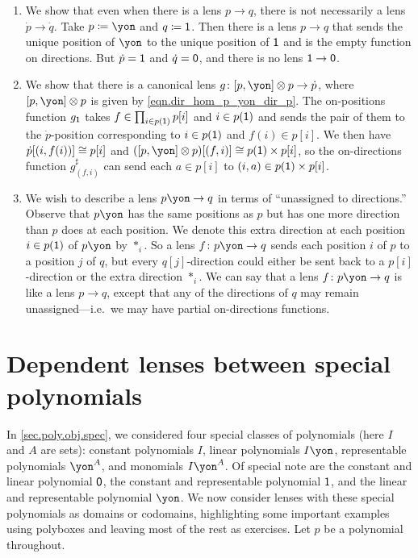 \documentclass[Book-Poly]{subfiles}
\begin{document}
\begin{exercise}
\begin{solution}
\begin{enumerate}
	\item We show that even when there is a lens $p \to q$, there is not necessarily a lens $\dot{p}\to\dot{q}$.
	Take $p \coloneqq \yon$ and $q \coloneqq \textsf{1}$.
	Then there is a lens $p \to q$ that sends the unique position of $\yon$ to the unique position of $\textsf{1}$ and is the empty function on directions.
	But $\dot{p} = \textsf{1}$ and $\dot{q} = \textsf{0}$, and there is no lens $\textsf{1} \to \textsf{0}$.

	\item We show that there is a canonical lens $g \colon \ihom{p,\yon} \otimes p \to \dot{p}$, where $\ihom{p,\yon} \otimes p$ is given by \eqref{eqn.dir_hom_p_yon_dir_p}.
	The on-positions function $g_{\textsf{1}}$ takes $f \in \prod_{i \in p(\textsf{1})} p[i]$ and $i \in p(\textsf{1})$ and sends the pair of them to the $\dot{p}$-position corresponding to $i \in p(\textsf{1})$ and $f(i) \in p[i]$.
	We then have $\dot{p}[(i, f(i))] \cong p[i]$ and $(\ihom{p,\yon} \otimes p)[(f, i)] \iso p(\1) \times p[i]$, so the on-directions function $g^\sharp_{(f,i)}$ can send each $a \in p[i]$ to $(i, a) \in p(\textsf{1}) \times p[i]$.

	\item We wish to describe a lens $p\yon \to q$ in terms of ``unassigned to directions.''
	Observe that $p\yon$ has the same positions as $p$ but has one more direction than $p$ does at each position.
	We denote this extra direction at each position $i \in p(\textsf{1})$ of $p\yon$ by $\ast_i$.
	So a lens $f \colon p\yon\to q$ sends each position $i$ of $p$ to a position $j$ of $q$, but every $q[j]$-direction could either be sent back to a $p[i]$-direction or the extra direction $\ast_i$.
	We can say that a lens $f \colon p\yon \to q$ is like a lens $p \to q$, except that any of the directions of $q$ may remain unassigned---i.e.\ we may have partial on-directions functions.
\end{enumerate}
\end{solution}
\end{exercise}

\section{Dependent lenses between special polynomials}

In \cref{sec.poly.obj.spec}, we considered four special classes of polynomials (here $I$ and $A$ are sets): constant polynomials $I$, linear polynomials $I\yon$, representable polynomials $\yon^A$, and monomials $I\yon^A$.
Of special note are the constant and linear polynomial $\textsf{0}$, the constant and representable polynomial $\textsf{1}$, and the linear and representable polynomial $\yon$.
We now consider lenses with these special polynomials as domains or codomains, highlighting some important examples using polyboxes and leaving most of the rest as exercises.
Let $p$ be a polynomial throughout.
\end{document}
